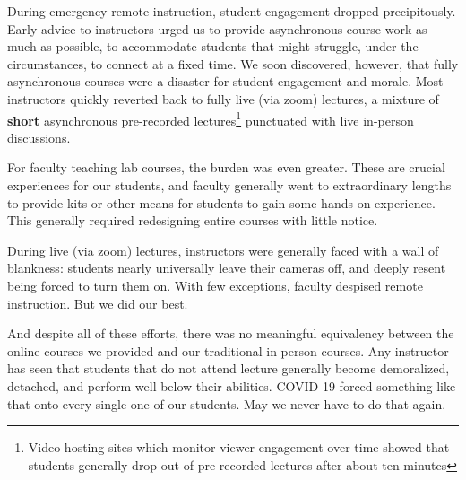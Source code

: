 \documentclass[12pt]{article}
\begin{document}
During emergency remote instruction, student engagement dropped
precipitously.  Early advice to instructors urged us to provide
asynchronous course work as much as possible, to accommodate students
that might struggle, under the circumstances, to connect at a fixed
time.  We soon discovered, however, that fully asynchronous courses
were a disaster for student engagement and morale.  Most instructors
quickly reverted back to fully live (via zoom) lectures, a mixture of
{\bf short} asynchronous pre-recorded lectures\footnote{Video hosting
  sites which monitor viewer engagement over time showed that students
  generally drop out of pre-recorded lectures after about ten minutes}
punctuated with live in-person discussions.

For faculty teaching lab courses, the burden was even greater.  These
are crucial experiences for our students, and faculty generally went
to extraordinary lengths to provide kits or other means for students
to gain some hands on experience.  This generally required redesigning
entire courses with little notice.

During live (via zoom) lectures, instructors were generally faced with
a wall of blankness: students nearly universally leave their cameras
off, and deeply resent being forced to turn them on.  With few
exceptions, faculty despised remote instruction.  But we did our best.

And despite all of these efforts, there was no meaningful equivalency
between the online courses we provided and our traditional in-person
courses.  Any instructor has seen that students that do not attend
lecture generally become demoralized, detached, and perform well below
their abilities.  COVID-19 forced something like that onto every
single one of our students.  May we never have to do that again.
\end{document}
